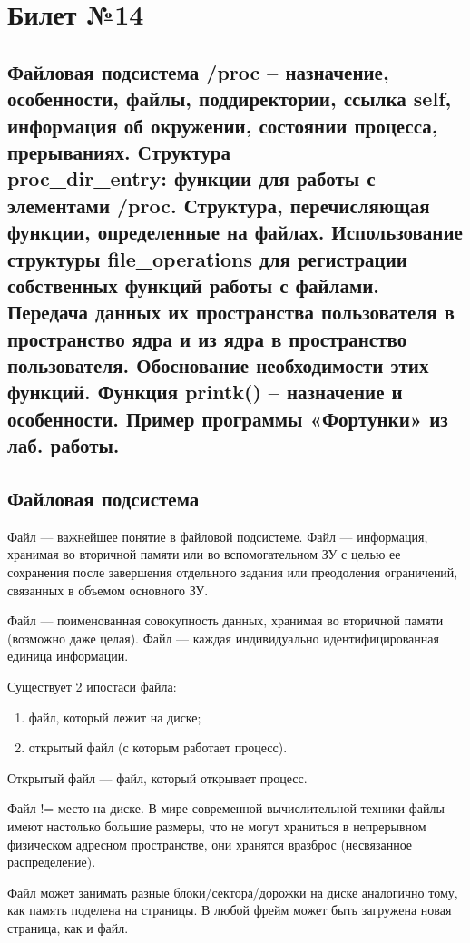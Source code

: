 \chapter{Билет №14}

\section*{Файловая подсистема /proc – назначение, особенности, файлы, поддиректории, ссылка self, информация об окружении, состоянии процесса, прерываниях. Структура\\ proc\_dir\_entry: функции для работы с элементами /proc. Структура, перечисляющая функции, определенные на файлах. Использование структуры file\_operations для регистрации собственных функций работы с файлами. Передача данных их пространства пользователя в пространство ядра и из ядра в пространство пользователя. Обоснование необходимости этих функций. Функция printk() – назначение и особенности. Пример программы «Фортунки» из лаб. работы.}

\section{Файловая подсистема}
Файл --- важнейшее понятие в файловой подсистеме. Файл --- информация, хранимая во вторичной памяти или во вспомогательном ЗУ с целью ее сохранения после завершения отдельного задания или преодоления ограничений, связанных в объемом основного ЗУ.

Файл --- поименованная совокупность данных, хранимая во вторичной памяти (возможно даже целая). Файл --- каждая индивидуально идентифицированная единица информации.

Существует 2 ипостаси файла:
\begin{enumerate}
	\item файл, который лежит на диске;
	\item открытый файл (с которым работает процесс).
\end{enumerate}

Открытый файл --- файл, который открывает процесс.

Файл != место на диске. В мире современной вычислительной техники файлы имеют настолько большие размеры, что не могут храниться в непрерывном физическом адресном пространстве, они хранятся вразброс (несвязанное распределение).

Файл может занимать разные блоки/сектора/дорожки на диске аналогично тому, как память поделена на страницы. В любой фрейм может быть загружена новая страница, как и файл. 

